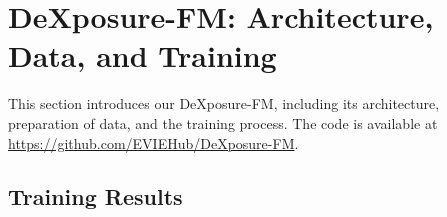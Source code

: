 \section{DeXposure-FM: Architecture, Data, and Training}

This section introduces our DeXposure-FM, including its architecture, preparation of data, and the training process. The code is available at \url{https://github.com/EVIEHub/DeXposure-FM}.





\subsection{Training Results}